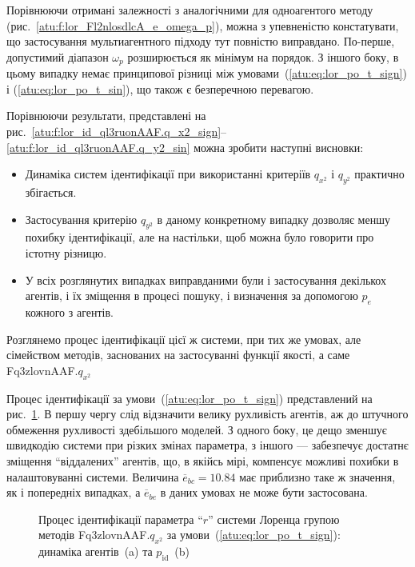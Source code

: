 Порівнюючи отримані залежності з аналогічними для
одноагентого методу (рис.~\ref{atu:f:lor_Fl2nlosdlcA_e_omega_p}), можна з
упевненістю констатувати, що застосування мультиагентного
підходу тут повністю виправдано. По-перше, допустимий діапазон
$\omega_p $ розширюється як мінімум на порядок. З іншого боку, в цьому
випадку немає принципової різниці між умовами~(\ref{atu:eq:lor_po_t_sign})
і (\ref{atu:eq:lor_po_t_sin}), що також є безперечною перевагою.




Порівнюючи результати, представлені на
рис.~\ref{atu:f:lor_id_ql3ruonAAF.q_x2_sign}--\ref{atu:f:lor_id_ql3ruonAAF.q_y2_sin} можна зробити
наступні висновки:

\begin{itemize}

  \item
   Динаміка систем ідентифікації при використанні критеріїв $q_{x^2}$ і $q_{y^2}$ практично збігається.

  \item
    Застосування критерію
    $q_{y^2}$ в даному конкретному випадку дозволяє меншу похибку
    ідентифікації, але на настільки, щоб можна було говорити про
    істотну різницю.

  \item
    У всіх розглянутих випадках виправданими були і застосування
    декількох агентів, і їх зміщення в процесі пошуку, і визначення
    за допомогою
    $p_e$ кожного з агентів.

\end{itemize}

Розглянемо процес ідентифікації цієї ж системи, при тих же
умовах, але сімейством методів, заснованих на застосуванні
функції якості, а саме
Fq3zlovnAAF.$q_{x^2}$

Процес ідентифікації за умови~(\ref{atu:eq:lor_po_t_sign}) представлений
на рис.~\ref{atu:f:lor_id_Fq3zlovnAAF.q_x2_sign}. В першу чергу слід відзначити
велику рухливість агентів, аж до штучного обмеження рухливості
здебільшого моделей. З одного боку, це дещо зменшує швидкодію
системи при різких змінах параметра, з іншого --- забезпечує
достатнє зміщення ``віддалених'' агентів, що, в якійсь мірі,
компенсує можливі похибки в налаштовуванні системи. Величина
$\overline{e}_{bc} = 10.84 $ має приблизно таке ж значення, як і попередніх
випадках, а
$\overline{e}_{be} $ в даних умовах не може бути застосована.

\begin{figure}[htb!]
  \caption{Процес ідентифікації параметра ``$r$'' системи Лоренца групою методів Fq3zlovnAAF.$q_{x^2} $ за умови~(\ref{atu:eq:lor_po_t_sign}): динаміка агентів~(a) та $p_\mathrm{id}$~(b)}
  \label{atu:f:lor_id_Fq3zlovnAAF.q_x2_sign}
\end{figure}

